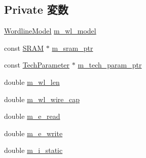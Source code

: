 \subsection*{Private 変数}
\begin{DoxyCompactItemize}
\item 
\hyperlink{classWordlineUnit_a986b9436bb01df2bc9d725db0935e836}{WordlineModel} \hyperlink{classWordlineUnit_a0641127826ee8c6f7635f4f7997d94c3}{m\_\-wl\_\-model}
\item 
const \hyperlink{classSRAM}{SRAM} $\ast$ \hyperlink{classWordlineUnit_aab5dce4213ab482c5e1909bfc96d62af}{m\_\-sram\_\-ptr}
\item 
const \hyperlink{classTechParameter}{TechParameter} $\ast$ \hyperlink{classWordlineUnit_a11d1644aa2bfe0e16783dface6fadf13}{m\_\-tech\_\-param\_\-ptr}
\item 
double \hyperlink{classWordlineUnit_af094edaeaf3975456c048ce02fa9585c}{m\_\-wl\_\-len}
\item 
double \hyperlink{classWordlineUnit_a156bb193afe5dc1b16642b7a42e3fc0f}{m\_\-wl\_\-wire\_\-cap}
\item 
double \hyperlink{classWordlineUnit_ac5ebde428aa2e75cb69d6d7b46d2a0ce}{m\_\-e\_\-read}
\item 
double \hyperlink{classWordlineUnit_a97e65df35d77a13b68d869219c2a58b1}{m\_\-e\_\-write}
\item 
double \hyperlink{classWordlineUnit_a16f0c9e5942378eab4d83da3c61aba7f}{m\_\-i\_\-static}
\end{DoxyCompactItemize}


